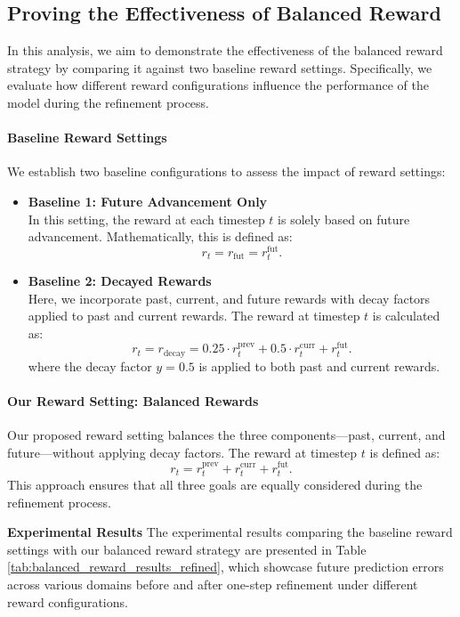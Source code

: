 \subsection{Proving the Effectiveness of Balanced Reward}

In this analysis, we aim to demonstrate the effectiveness of the balanced reward strategy by comparing it against two baseline reward settings. Specifically, we evaluate how different reward configurations influence the performance of the model during the refinement process.


\paragraph{Baseline Reward Settings}
We establish two baseline configurations to assess the impact of reward settings:

\begin{itemize}[noitemsep,left=0pt]
    \item \textbf{Baseline 1: Future Advancement Only} \\
    In this setting, the reward at each timestep $t$ is solely based on future advancement. Mathematically, this is defined as:
    \[
    r_t = r_{\text{fut}} = r_t^{\text{fut}}. \tag{14}
    \]
    
    \item \textbf{Baseline 2: Decayed Rewards} \\
    Here, we incorporate past, current, and future rewards with decay factors applied to past and current rewards. The reward at timestep $t$ is calculated as:
    \[
    r_t = r_{\text{decay}} = 0.25 \cdot r_t^{\text{prev}} + 0.5 \cdot r_t^{\text{curr}} + r_t^{\text{fut}}. \tag{15}
    \]
    where the decay factor $y = 0.5$ is applied to both past and current rewards.
\end{itemize}

\paragraph{Our Reward Setting: Balanced Rewards}
Our proposed reward setting balances the three components—past, current, and future—without applying decay factors. The reward at timestep $t$ is defined as:
\[
r_t = r_t^{\text{prev}} + r_t^{\text{curr}} + r_t^{\text{fut}}. \tag{16}
\]
This approach ensures that all three goals are equally considered during the refinement process.

\textbf{Experimental Results}
The experimental results comparing the baseline reward settings with our balanced reward strategy are presented in Table \ref{tab:balanced_reward_results_refined}, which showcase future prediction errors across various domains before and after one-step refinement under different reward configurations.

